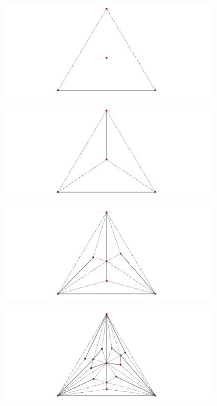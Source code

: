 \documentclass{beamer}
\begin{document}
\begin{frame}
\begin{figure}[h]
\includegraphics[width=\textwidth]{Tokunaga-2}
\end{figure}
\end{frame}
\begin{frame}
\begin{figure}[h]
\includegraphics[width=\textwidth]{Tokunaga-3}
\end{figure}
\end{frame}
\begin{frame}
\begin{figure}[h]
\includegraphics[width=\textwidth]{Tokunaga-4}
\end{figure}
\end{frame}
\begin{frame}
\begin{figure}[h]
\includegraphics[width=\textwidth]{Tokunaga-5}
\end{figure}
\end{frame}
\end{document}
